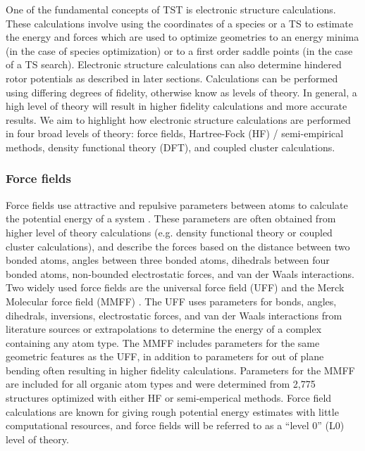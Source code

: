 \documentclass[preprint, 11pt]{elsarticle} %
\begin{document}
One of the fundamental concepts of TST is electronic structure calculations.
These calculations involve using the coordinates of a species or a TS to estimate the energy and forces \cite{simons:2003} which are used to optimize geometries to an energy minima (in the case of species optimization) or to a first order saddle points (in the case of a TS search).
Electronic structure calculations can also determine hindered rotor potentials as described in later sections. 
Calculations can be performed using differing degrees of fidelity, otherwise know as levels of theory. 
In general, a high level of theory will result in higher fidelity calculations and more accurate results.
We aim to highlight how electronic structure calculations are performed in four broad levels of theory: force fields, Hartree-Fock (HF) / semi-empirical methods, density functional theory (DFT), and coupled cluster calculations. 

\subsubsection{Force fields}

Force fields use attractive and repulsive parameters between atoms to calculate the potential energy of a system \cite{gonzalez:2011}. 
These parameters are often obtained from higher level of theory calculations (e.g. density functional theory or coupled cluster calculations), and describe the forces based on the distance between two bonded atoms, angles between three bonded atoms, dihedrals between four bonded atoms, non-bounded electrostatic forces, and van der Waals interactions.
Two widely used force fields are the universal force field (UFF) \cite{UFF:1992} and the Merck Molecular force field (MMFF) \cite{MMFF94:1996}.
The UFF uses parameters for bonds, angles, dihedrals, inversions, electrostatic forces, and van der Waals interactions from literature sources or extrapolations to determine the energy of a complex containing any atom type.
The MMFF includes parameters for the same geometric features as the UFF, in addition to parameters for out of plane bending often resulting in higher fidelity calculations. 
Parameters for the MMFF are included for all organic atom types and were determined from 2,775 structures optimized with either HF or semi-emperical methods.
Force field calculations are known for giving rough potential energy estimates with little computational resources, and force fields will be referred to as a ``level 0'' (L0) level of theory.
\end{document}
